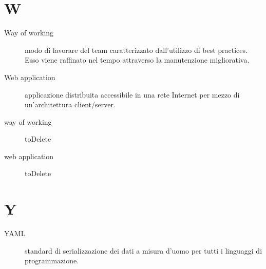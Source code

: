 \documentclass{article}
\begin{document}
  \section{W}
  \begin{description}
    \item[Way of working] modo di lavorare del team caratterizzato dall'utilizzo di best practices. Esso viene raffinato nel tempo attraverso la manutenzione migliorativa.
    \item[Web application] applicazione distribuita accessibile in una rete Internet per mezzo di un'architettura client/server.
    \item[way of working] toDelete
    \item[web application] toDelete
	\end{description}
  \section{Y}
  \begin{description}
    \item[YAML] standard di serializzazione dei dati a misura d'uomo per tutti i linguaggi di programmazione.
	\end{description}
\end{document}
